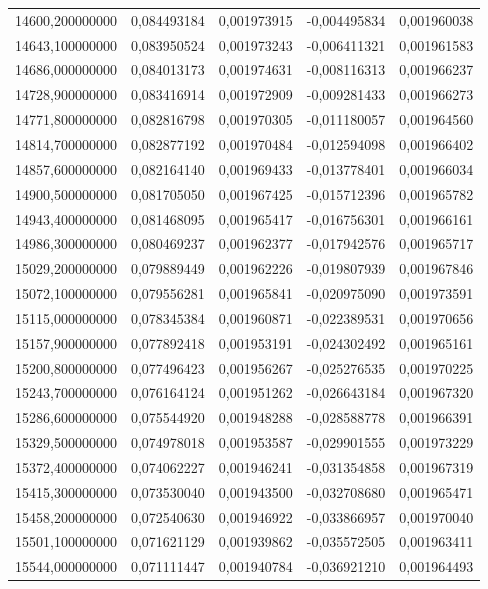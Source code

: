 \begin{longtable}{rrrrr}
14600,200000000 & 0,084493184 & 0,001973915 & -0,004495834 & 0,001960038\\
14643,100000000 & 0,083950524 & 0,001973243 & -0,006411321 & 0,001961583\\
14686,000000000 & 0,084013173 & 0,001974631 & -0,008116313 & 0,001966237\\
14728,900000000 & 0,083416914 & 0,001972909 & -0,009281433 & 0,001966273\\
14771,800000000 & 0,082816798 & 0,001970305 & -0,011180057 & 0,001964560\\
14814,700000000 & 0,082877192 & 0,001970484 & -0,012594098 & 0,001966402\\
14857,600000000 & 0,082164140 & 0,001969433 & -0,013778401 & 0,001966034\\
14900,500000000 & 0,081705050 & 0,001967425 & -0,015712396 & 0,001965782\\
14943,400000000 & 0,081468095 & 0,001965417 & -0,016756301 & 0,001966161\\
14986,300000000 & 0,080469237 & 0,001962377 & -0,017942576 & 0,001965717\\
15029,200000000 & 0,079889449 & 0,001962226 & -0,019807939 & 0,001967846\\
15072,100000000 & 0,079556281 & 0,001965841 & -0,020975090 & 0,001973591\\
15115,000000000 & 0,078345384 & 0,001960871 & -0,022389531 & 0,001970656\\
15157,900000000 & 0,077892418 & 0,001953191 & -0,024302492 & 0,001965161\\
15200,800000000 & 0,077496423 & 0,001956267 & -0,025276535 & 0,001970225\\
15243,700000000 & 0,076164124 & 0,001951262 & -0,026643184 & 0,001967320\\
15286,600000000 & 0,075544920 & 0,001948288 & -0,028588778 & 0,001966391\\
15329,500000000 & 0,074978018 & 0,001953587 & -0,029901555 & 0,001973229\\
15372,400000000 & 0,074062227 & 0,001946241 & -0,031354858 & 0,001967319\\
15415,300000000 & 0,073530040 & 0,001943500 & -0,032708680 & 0,001965471\\
15458,200000000 & 0,072540630 & 0,001946922 & -0,033866957 & 0,001970040\\
15501,100000000 & 0,071621129 & 0,001939862 & -0,035572505 & 0,001963411\\
15544,000000000 & 0,071111447 & 0,001940784 & -0,036921210 & 0,001964493\\

\end{longtable}
